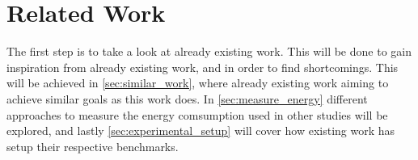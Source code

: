 \chapter{Related Work}\label{ch:related_work}

The first step is to take a look at already existing work. This will be done to gain inspiration from already existing work, and in order to find shortcomings. This will be achieved in \cref*{sec:similar_work}, where already existing work aiming to achieve similar goals as this work does. In \cref*{sec:measure_energy} different approaches to measure the energy comsumption used in other studies will be explored, and lastly \cref*{sec:experimental_setup} will cover how existing work has setup their respective benchmarks.


% 

